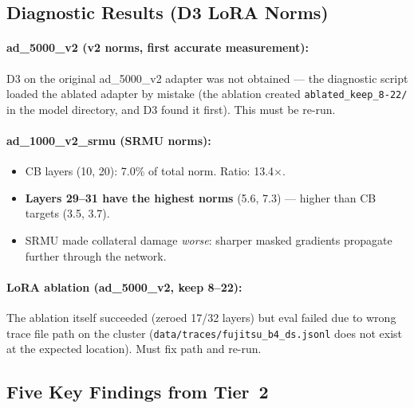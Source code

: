 \documentclass[11pt]{article}
\newcommand{\bad}[1]{\textcolor{bad}{#1}}
\begin{document}
\subsection{Diagnostic Results (D3 LoRA Norms)}

\paragraph{ad\_5000\_v2 (v2 norms, first accurate measurement):}
D3 on the original ad\_5000\_v2 adapter was not obtained --- the diagnostic
script loaded the ablated adapter by mistake (the ablation created
\texttt{ablated\_keep\_8-22/} in the model directory, and D3 found it first).
This must be re-run.

\paragraph{ad\_1000\_v2\_srmu (SRMU norms):}
\begin{itemize}
  \item CB layers (10, 20): 7.0\% of total norm.  Ratio: 13.4$\times$.
  \item \textbf{Layers 29--31 have the highest norms} (5.6, 7.3) --- higher
        than CB targets (3.5, 3.7).
  \item SRMU made collateral damage \emph{worse}: sharper masked gradients
        propagate further through the network.
\end{itemize}

\paragraph{LoRA ablation (ad\_5000\_v2, keep 8--22):}
The ablation itself succeeded (zeroed 17/32 layers) but \bad{eval failed}
due to wrong trace file path on the cluster
(\texttt{data/traces/fujitsu\_b4\_ds.jsonl} does not exist at the expected
location).  Must fix path and re-run.

\subsection{Five Key Findings from Tier~2}
\end{document}
